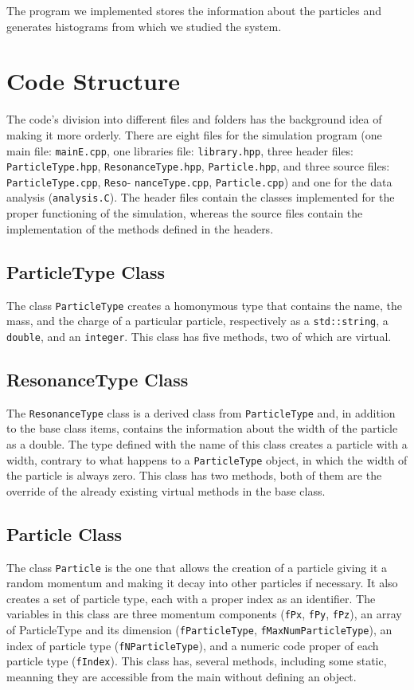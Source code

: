 \documentclass[a4paper, 11pt]{article}
\begin{document}
    The program we implemented stores the information about the particles and generates histograms from which we studied the system.
    \section{Code Structure}
      The code's division into different files and folders has the background idea of making it more orderly. There are eight files for the simulation program (one main file: \verb|mainE.cpp|, one libraries file: \verb|library.hpp|, three header files: \verb|ParticleType.hpp|, \verb|ResonanceType.hpp|, \verb|Particle.hpp|, and three source files: \verb|ParticleType.cpp|, \verb|Reso|- \verb|nanceType.cpp|, \verb|Particle.cpp|) and one for the data analysis (\verb|analysis.C|).
      The header files contain the classes implemented for the proper functioning of the simulation, whereas the source files contain the implementation of the methods defined in the headers.
      \subsection*{ParticleType Class}
      The class \verb|ParticleType| creates a homonymous type that contains the name, the mass, and the charge of a particular particle, respectively as a \verb|std::string|, a \verb|double|, and an \verb|integer|. This class has five methods, two of which are virtual.
      \subsection* {ResonanceType Class}
      The \verb|ResonanceType| class is a derived class from \verb|ParticleType| and, in addition to the base class items, contains the information about the width of the particle as a double. The type defined with the name of this class creates a particle with a width, contrary to what happens to a \verb|ParticleType| object, in which the width of the particle is always zero. This class has two methods, both of them are the override of the already existing virtual methods in the base class.
      \subsection* {Particle Class}
      The class \verb|Particle| is the one that allows the creation of a particle giving it a random momentum and making it decay into other particles if necessary. It also creates a set of particle type, each with a proper index as an identifier. The variables in this class are three momentum components (\verb|fPx|, \verb|fPy|, \verb|fPz|), an array of ParticleType and its dimension (\verb|fParticleType|, \verb|fMaxNumParticleType|), an index of particle type (\verb|fNParticleType|), and a numeric code proper of each particle type (\verb|fIndex|). This class has, several methods, including some static, meanning they are accessible from the main without defining an object.
\end{document}
